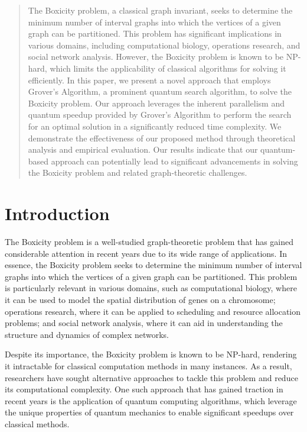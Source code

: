 \begin{abstract}
The Boxicity problem, a classical graph invariant, seeks to determine the minimum number of interval graphs into which the vertices of a given graph can be partitioned. This problem has significant implications in various domains, including computational biology, operations research, and social network analysis. However, the Boxicity problem is known to be NP-hard, which limits the applicability of classical algorithms for solving it efficiently. In this paper, we present a novel approach that employs Grover's Algorithm, a prominent quantum search algorithm, to solve the Boxicity problem. Our approach leverages the inherent parallelism and quantum speedup provided by Grover's Algorithm to perform the search for an optimal solution in a significantly reduced time complexity. We demonstrate the effectiveness of our proposed method through theoretical analysis and empirical evaluation. Our results indicate that our quantum-based approach can potentially lead to significant advancements in solving the Boxicity problem and related graph-theoretic challenges.

\end{abstract}

\section{Introduction}
The Boxicity problem is a well-studied graph-theoretic problem that has gained considerable attention in recent years due to its wide range of applications. In essence, the Boxicity problem seeks to determine the minimum number of interval graphs into which the vertices of a given graph can be partitioned. This problem is particularly relevant in various domains, such as computational biology, where it can be used to model the spatial distribution of genes on a chromosome; operations research, where it can be applied to scheduling and resource allocation problems; and social network analysis, where it can aid in understanding the structure and dynamics of complex networks.

Despite its importance, the Boxicity problem is known to be NP-hard, rendering it intractable for classical computation methods in many instances. As a result, researchers have sought alternative approaches to tackle this problem and reduce its computational complexity. One such approach that has gained traction in recent years is the application of quantum computing algorithms, which leverage the unique properties of quantum mechanics to enable significant speedups over classical methods.

